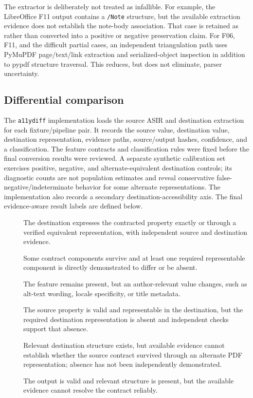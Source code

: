 The extractor is deliberately not treated as infallible. For example, the LibreOffice F11 output contains a \texttt{/Note} structure, but the available extraction evidence does not establish the note-body association. That case is retained as \measured{} rather than converted into a positive or negative preservation claim. For F06, F11, and the difficult partial cases, an independent triangulation path uses PyMuPDF page/text/link extraction and serialized-object inspection in addition to pypdf structure traversal. This reduces, but does not eliminate, parser uncertainty.

\subsection{Differential comparison}

The \texttt{a11ydiff} implementation loads the source ASIR and destination extraction for each fixture/pipeline pair. It records the source value, destination value, destination representation, evidence paths, source/output hashes, confidence, and a classification. The feature contracts and classification rules were fixed before the final conversion results were reviewed. A separate synthetic calibration set exercises positive, negative, and alternate-equivalent destination controls; its diagnostic counts are not population estimates and reveal conservative false-negative/indeterminate behavior for some alternate representations. The implementation also records a secondary destination-accessibility axis. The final evidence-aware result labels are defined below.

\begin{description}
\item[\verifiedpreserved] The destination expresses the contracted property exactly or through a verified equivalent representation, with independent source and destination evidence.
\item[\observedpartial] Some contract components survive and at least one required representable component is directly demonstrated to differ or be absent.
\item[\altered] The feature remains present, but an author-relevant value changes, such as alt-text wording, locale specificity, or title metadata.
\item[\confirmedlost] The source property is valid and representable in the destination, but the required destination representation is absent and independent checks support that absence.
\item[\unresolved] Relevant destination structure exists, but available evidence cannot establish whether the source contract survived through an alternate PDF representation; absence has not been independently demonstrated.
\item[\measured] The output is valid and relevant structure is present, but the available evidence cannot resolve the contract reliably.
\end{description}

